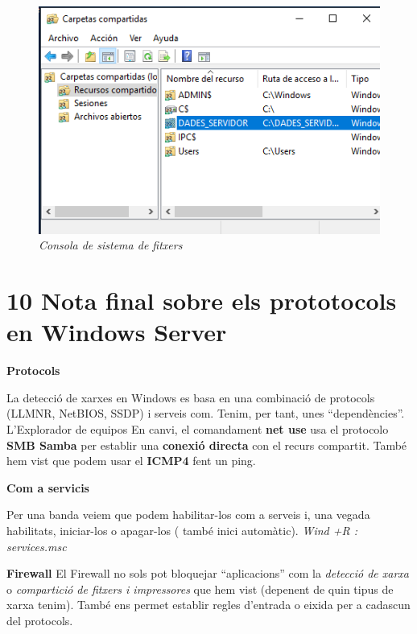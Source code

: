\documentclass[
  a4paper,
]{article}
\begin{document}
\begin{figure}
\centering
\includegraphics{png/fsmgmt.png}
\caption{\emph{Consola de sistema de fitxers}}
\end{figure}

\section{10 Nota final sobre els prototocols en Windows
Server}\label{nota-final-sobre-els-prototocols-en-windows-server}

\textbf{Protocols}

La detecció de xarxes en Windows es basa en una combinació de protocols
(LLMNR, NetBIOS, SSDP) i serveis com. Tenim, per tant, unes
``dependències''. L'Explorador de equipos En canvi, el comandament
\textbf{net use} usa el protocolo \textbf{SMB Samba} per establir una
\textbf{conexió directa} con el recurs compartit. També hem vist que
podem usar el \textbf{ICMP4} fent un ping.

\textbf{Com a servicis}

Per una banda veiem que podem habilitar-los com a serveis i, una vegada
habilitats, iniciar-los o apagar-los ( també inici automàtic).
\emph{Wind +R : services.msc}

\textbf{Firewall} El Firewall no sols pot bloquejar ``aplicacions'' com
la \emph{detecció de xarxa} o \emph{compartició de fitxers i
impressores} que hem vist (depenent de quin tipus de xarxa tenim). També
ens permet establir regles d'entrada o eixida per a cadascun del
protocols.
\end{document}
